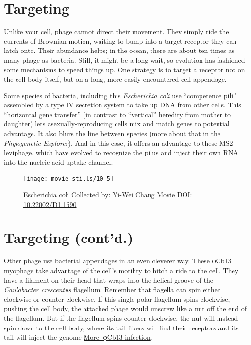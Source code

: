 \documentclass[]{tufte-book}
\begin{document}
\section{Targeting}\label{targeting}

Unlike your cell, phage cannot direct their movement. They simply ride
the currents of Brownian motion, waiting to bump into a target receptor
they can latch onto. Their abundance helps; in the ocean, there are
about ten times as many phage as bacteria. Still, it might be a long
wait, so evolution has fashioned some mechanisms to speed things up. One
strategy is to target a receptor not on the cell body itself, but on a
long, more easily-encountered cell appendage.

Some species of bacteria, including this \emph{Escherichia coli} use
``competence pili'' assembled by a type IV secretion system to take up
DNA from other cells. This ``horizontal gene transfer'' (in contrast to
``vertical'' heredity from mother to daughter) lets
asexually-reproducing cells mix and match genes to potential advantage.
It also blurs the line between species (more about that in the
\emph{Phylogenetic Explorer}). And in this case, it offers an advantage
to these MS2 leviphage, which have evolved to recognize the pilus and
inject their own RNA into the nucleic acid uptake channel.





\begin{figure}
\texttt{[image: movie\_stills/10\_5]} \caption[Escherichia coli Collected by:
\protect\hyperlink{yi-wei_chang}{Yi-Wei Chang} Movie DOI:
\href{https://doi.org/10.22002/D1.1590}{10.22002/D1.1590}]{Escherichia coli Collected by:
\protect\hyperlink{yi-wei_chang}{Yi-Wei Chang} Movie DOI:
\href{https://doi.org/10.22002/D1.1590}{10.22002/D1.1590}}\label{fig:10-5}
\end{figure}

\section{Targeting (cont'd.)}\label{targeting-contd.}

Other phage use bacterial appendages in an even cleverer way. These
φCb13 myophage take advantage of the cell's motility to hitch a ride to
the cell. They have a filament on their head that wraps into the helical
groove of the \emph{Caulobacter crescentus} flagellum. Remember that
flagella can spin either clockwise or counter-clockwise. If this single
polar flagellum spins clockwise, pushing the cell body, the attached
phage would unscrew like a nut off the end of the flagellum. But if the
flagellum spins counter-clockwise, the nut will instead spin down to the
cell body, where its tail fibers will find their receptors and its tail
will inject the genome \protect\hyperlink{ux3c6Cb13_infection}{More:
φCb13 infection}.
\end{document}
